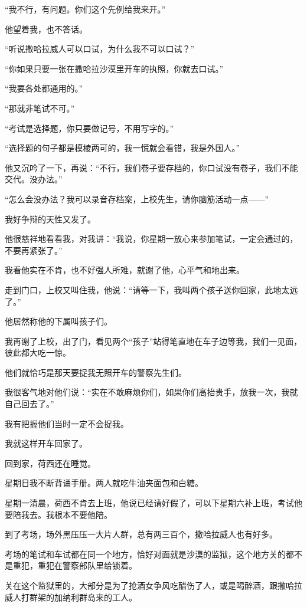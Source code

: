 \par “我不行，有问题。你们这个先例给我来开。”
\par 他望着我，也不答话。
\par “听说撒哈拉威人可以口试，为什么我不可以口试？”
\par “你如果只要一张在撒哈拉沙漠里开车的执照，你就去口试。”
\par “我要各处都通用的。”
\par “那就非笔试不可。”
\par “考试是选择题，你只要做记号，不用写字的。”
\par “选择题的句子都是模棱两可的，我一慌就会看错，我是外国人。”
\par 他又沉吟了一下，再说：“不行，我们卷子要存档的，你口试没有卷子，我们不能交代。没办法。”
\par “怎么会没办法？我可以录音存档案，上校先生，请你脑筋活动一点——”
\par 我好争辩的天性又发了。
\par 他很慈祥地看看我，对我讲：“我说，你星期一放心来参加笔试，一定会通过的，不要再紧张了。”
\par 我看他实在不肯，也不好强人所难，就谢了他，心平气和地出来。
\par 走到门口，上校又叫住我，他说：“请等一下，我叫两个孩子送你回家，此地太远了。”
\par 他居然称他的下属叫孩子们。
\par 我再谢了上校，出了门，看见两个“孩子”站得笔直地在车子边等我，我们一见面，彼此都大吃一惊。
\par 他们就恰巧是那天要捉我无照开车的警察先生们。
\par 我很客气地对他们说：“实在不敢麻烦你们，如果你们高抬贵手，放我一次，我就自己回去了。”
\par 我有把握他们当时一定不会捉我。
\par 我就这样开车回家了。
\par 回到家，荷西还在睡觉。
\par 星期日我不断背诵手册。两人就吃牛油夹面包和白糖。
\par 星期一清晨，荷西不肯去上班，他说已经请好假了，可以下星期六补上班，考试他要陪我去。我根本不要他陪。
\par 到了考场，场外黑压压一大片人群，总有两三百个，撒哈拉威人也有好多。
\par 考场的笔试和车试都在同一个地方，恰好对面就是沙漠的监狱，这个地方关的都不是重犯，重犯在警察部队里给锁着。
\par 关在这个监狱里的，大部分是为了抢酒女争风吃醋伤了人，或是喝醉酒，跟撒哈拉威人打群架的加纳利群岛来的工人。

